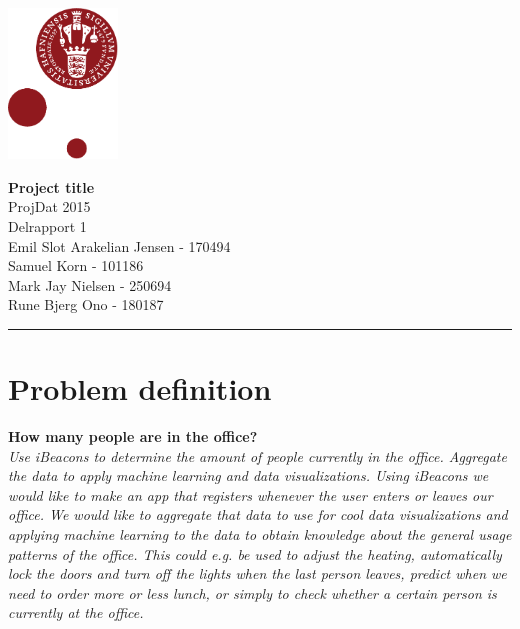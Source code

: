 \documentclass[12pt]{article}
\begin{document}
\begin{minipage}[b]{1.0\linewidth} 
\includegraphics[height=40mm]{KULogo}

\vspace*{-30ex}
\begin{center}
    {\Large \bf Project title} \vspace*{1ex} \\
    {\large ProjDat 2015} \vspace*{1ex} \\
    {\large Delrapport 1} \vspace*{1ex} \\
    {\large Emil Slot Arakelian Jensen - 170494} \vspace*{1ex}\\
    {\large Samuel Korn - 101186} \vspace*{1ex}\\
    {\large Mark Jay Nielsen - 250694} \vspace*{1ex}\\
    {\large Rune Bjerg Ono - 180187} \vspace*{1ex}\\
\end{center}

\vspace*{-3pt}
{\color{KU-red}\hrule}
\end{minipage}










\newpage

\tableofcontents










\newpage
\section{Problem definition}
\textbf{How many people are in the office?}\\
\textit{Use iBeacons to determine the amount of people currently in the office. Aggregate the data to apply machine learning and data visualizations.
Using iBeacons we would like to make an app that registers whenever the user enters or leaves our office. We would like to aggregate that data to use for cool data visualizations and applying machine learning to the data to obtain knowledge about the general usage patterns of the office. This could e.g. be used to adjust the heating, automatically lock the doors and turn off the lights when the last person leaves, predict when we need to order more or less lunch, or simply to check whether a certain person is currently at the office.} \cite{website}\\
\end{document}

